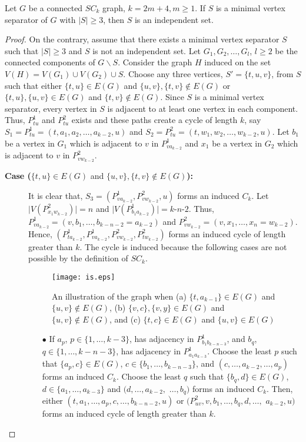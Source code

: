 \documentclass[runningheads]{llncs}
\begin{document}
\begin{lemma}
\label{mvsindependent}
Let $G$ be a connected $SC_k$ graph, $k=2m+4, m \geq 1$. If $S$ is a minimal vertex separator of $G$ with $\mid S\mid \geq 3$, then $S$ is an independent set.
\end{lemma}
\begin{proof}
On the contrary, assume that there exists a minimal vertex separator $S$ such that $\mid S\mid \geq 3$ and $S$ is not an independent set. Let $G_1, G_2, \ldots, G_l$, $l\geq 2$ be the connected components of $G\backslash S$. Consider the graph $H$ induced on the set $V(H) = V(G_1) \cup V(G_2) \cup S$. Choose any three vertices, $S'=\{t,u,v\}$, from $S$ such that either $\{t,u\} \in E(G)$ and $\{u,v\},\{t,v\} \notin E(G)$ or $\{t,u\},\{u,v\} \in E(G)$ and $\{t,v\} \notin E(G)$. Since $S$ is a minimal vertex separator, every vertex in $S$ is adjacent to at least one vertex in each component. Thus, $P^{1}_{tu}$ and $P^{2}_{tu}$ exists and these paths create a cycle of length $k$, say $S_1=P^{1}_{tu}=(t,a_1,a_2,\ldots,a_{k-2},u)$ and $S_2=P^{2}_{tu}=(t,w_1,w_2,\ldots,w_{k-2},u)$. Let $b_1$ be a vertex in $G_1$ which is adjacent to $v$ in $P^{1}_{va_{k-2}}$ and $x_1$ be a vertex in $G_2$ which is adjacent to $v$ in $P^{2}_{vw_{k-2}}$.
\begin{description}

\item[\textbf{Case ($\{t,u\} \in E(G)$} and \textbf{$\{u,v\},\{t,v\} \notin E(G)$):}] 
 It is clear that, $S_3 = (P^{1}_{va_{k-2}},P^{2}_{vw_{k-2}},u)$ forms an induced $C_k$. Let $\mid V(P^{2}_{x_1w_{k-2}}) \mid = n$ and $\mid V(P^{1}_{b_1a_{k-2}}) \mid = k$-$n$-$2$. Thus, $P^{1}_{va_{k-2}}=(v,b_1,\ldots,b_{k-n-2}=a_{k-2})$ and $P^{2}_{vw_{k-2}}=(v,x_1,\ldots,x_n=w_{k-2})$. Hence, $(P_{ta_{k-2}}^{1}, P_{va_{k-2}}^{1}, P_{vw_{k-2}}^{2}, P_{tw_{k-2}}^{2})$ forms an induced cycle of length greater than $k$. The cycle is induced because the following cases are not possible by the definition of $SC_k$.

\begin{figure}[h]
\centering
\texttt{[image: is.eps]}
\caption{An illustration of the graph when (a) $\{t,a_{k-1}\}\in E(G)$ and $\{u,v\} \notin E(G)$, (b) $\{v,c\}, \{v,y\}\in E(G)$ and $\{u,v\} \notin E(G)$, and (c) $\{t,c\} \in E(G)$ and $\{u,v\} \in E(G)$ }
\label{fig:is1}
\end{figure}


\begin{itemize}
\item[$\bullet$]  If $a_p$, $p \in \{1,\ldots,k-3\}$, has adjacency in $P^{1}_{b_1b_{k-n-3}}$, and $b_q$, $q \in\{1,\ldots, k-n-3\}$, has adjacency in $P^{1}_{a_1a_{k-3}}$. Choose the least $p$ such that $\{a_p,c\}\in E(G)$, $c\in \{b_1,\ldots, b_{k-n-3}\}$, and $(c, \ldots, a_{k-2}, \ldots, a_p)$ forms an induced $C_k$. Choose the least $q$ such that $\{b_q,d\}\in E(G)$, $d\in \{a_1,\ldots, a_{k-3}\}$ and $(d, \ldots, a_{k-2},$ $\ldots, b_q)$ forms an induced $C_k$. Then, either $(t,a_1,\ldots, a_p, c, \ldots, b_{k-n-2},u)$ or $(P^{2}_{uv}, v, b_1, \ldots, b_q, d, \ldots,$ $a_{k-2}, u)$ forms an induced cycle of length greater than $k$. 


\end{itemize}
\end{description}
\end{proof}
\end{document}
